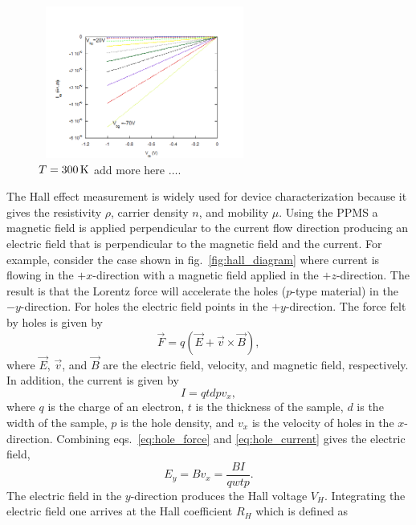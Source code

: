 \begin{figure}[ht]
	\centering
	\includegraphics[height=5cm,width=7cm]{figs/results/Vds-Id_1V_-1V-Vbg_20V_-70V_T1-D_T5_S_300K_plot_modified}
	\caption[$I-V$ characteristics]{$T=300\,\mathrm{K}$ add more here $\ldots$.}
\end{figure}

\noindent The Hall effect measurement is widely used for device characterization because it gives the resistivity $\rho$, carrier density $n$, and mobility $\mu$. Using the \acs{PPMS} a magnetic field is applied perpendicular to the current flow direction producing an electric field that is perpendicular to the magnetic field and the current. For example, consider the case shown in fig.~\ref{fig:hall_diagram} where current is flowing in the $+x$-direction with a magnetic field applied in the $+z$-direction. The result is that the Lorentz force will accelerate the holes ($p$-type material) in the $-y$-direction. For holes the electric field points in the $+y$-direction. The force felt by holes is given by
\begin{equation}\label{eq:hole_force}
	\vec{F} = q\left(\vec{E} + \vec{v}\times \vec{B}\right),
\end{equation}
where $\vec{E}$, $\vec{v}$, and $\vec{B}$ are the electric field, velocity, and magnetic field, respectively. In addition, the current is given by
\begin{equation}\label{eq:hole_current}
	I = q t d p v_x,
\end{equation}
where $q$ is the charge of an electron, $t$ is the thickness of the sample, $d$ is the width of the sample, $p$ is the hole density, and $v_x$ is the velocity of holes in the $x$-direction. Combining eqs.~\ref{eq:hole_force} and \ref{eq:hole_current} gives the electric field,
\begin{equation}\label{eq:efield}
	E_y = B v_x = \frac{B I}{q w t p}.
\end{equation}
The electric field in the $y$-direction produces the Hall voltage $V_H$. Integrating the electric field one arrives at the Hall coefficient $R_H$ which is defined as 
